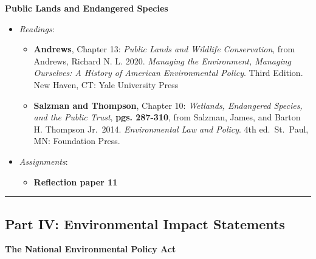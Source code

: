 \week \textbf{Public Lands and Endangered Species}

\begin{itemize}

\item
  \emph{Readings}:

  \begin{itemize}
  
  \item
    \textbf{Andrews}, Chapter 13: \emph{Public Lands and Wildlife
    Conservation}, from Andrews, Richard N. L. 2020. \emph{Managing the
    Environment, Managing Ourselves: A History of American Environmental
    Policy}. Third Edition. New Haven, CT: Yale University Press
  \item
    \textbf{Salzman and Thompson}, Chapter 10: \emph{Wetlands,
    Endangered Species, and the Public Trust}, \textbf{pgs. 287-310},
    from Salzman, James, and Barton H. Thompson Jr.~2014.
    \emph{Environmental Law and Policy}. 4th ed.~St.~Paul, MN:
    Foundation Press.
  \end{itemize}
\item
  \emph{Assignments}:

  \begin{itemize}
  
  \item
    \textbf{Reflection paper 11}
  \end{itemize}
\end{itemize}

\begin{center}\rule{0.5\linewidth}{0.5pt}\end{center}

\hypertarget{part-iv-environmental-impact-statements}{%
\subsection{Part IV: Environmental Impact
Statements}\label{part-iv-environmental-impact-statements}}

\week \textbf{The National Environmental Policy Act}

